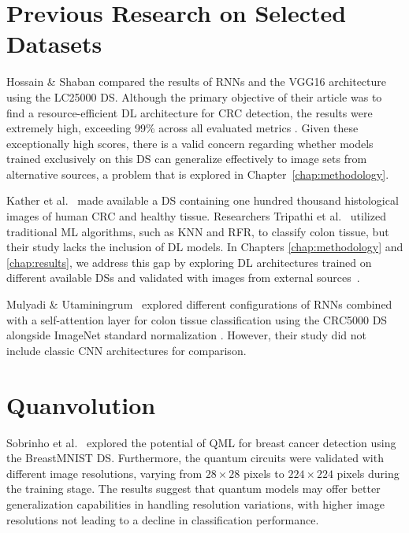 \section{Previous Research on Selected Datasets}
\label{sec_dataset_usage}

Hossain \& Shaban \cite{DBLP:conf/aibthings/HossainS24} compared the results of \glspl{RNN} and the \gls{VGG}16 architecture using the \gls{LC25000} \gls{DS}. Although the primary objective of their article was to find a resource-efficient \gls{DL} architecture for \gls{CRC} detection, the results were extremely high, exceeding 99\% across all evaluated metrics \cite{metrics}. Given these exceptionally high scores, there is a valid concern regarding whether models trained exclusively on this \gls{DS} can generalize effectively to image sets from alternative sources, a problem that is explored in Chapter~\ref{chap:methodology}.

Kather et al.~\cite{kather2018crc100k} made available a \gls{DS} containing one hundred thousand histological images of human \gls{CRC} and healthy tissue. Researchers Tripathi et al.~\cite{colonML} utilized traditional \gls{ML} algorithms, such as \gls{KNN} and \gls{RFR}, to classify colon tissue, but their study lacks the inclusion of \gls{DL} models. In Chapters \ref{chap:methodology} and \ref{chap:results}, we address this gap by exploring \gls{DL} architectures trained on different available \glspl{DS} and validated with images from external sources~\cite{borkowski2019lungcoloncancerhistopathological, kather_2016_53169}.

Mulyadi \& Utaminingrum~\cite{10913097} explored different configurations of \glspl{RNN} combined with a self-attention layer for colon tissue classification using the \gls{CRC5000} \gls{DS} alongside ImageNet standard normalization \cite{DBLP:conf/nips/KrizhevskySH12}. However, their study did not include classic \gls{CNN} architectures for comparison.

\section{Quanvolution}
\label{sec_quanvolution_related_works}
Sobrinho et al.~\cite{quanvolution} explored the potential of \gls{QML} for breast cancer detection using the BreastMNIST \gls{DS}. Furthermore, the quantum circuits were validated with different image resolutions, varying from $28 \times 28$ pixels to $224 \times 224$ pixels during the training stage. The results suggest that quantum models may offer better generalization capabilities in handling resolution variations, with higher image resolutions not leading to a decline in classification performance.

